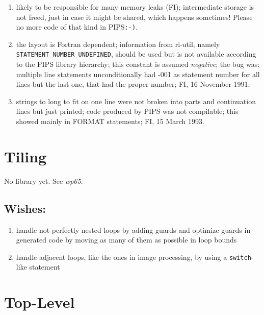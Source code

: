 \begin{enumerate}

  \item likely to be responsible for many memory leaks (FI); intermediate
	storage is not freed, just in case it might be shared, which happens
	sometimes! Please no more code of that kind in PIPS\verb+:-)+.

  \item the layout is Fortran dependent; information from ri-util,
	namely \verb+STATEMENT_NUMBER_UNDEFINED+, should be used but is
	not available according to the PIPS library hierarchy; this constant
	is assumed {\em negative}; the bug was: multiple line statements
	unconditionally had -001 as statement number for all lines but
	the last one, that had the proper number; FI, 16 November 1991;

  \item strings to long to fit on one line were not broken into parts
	and continuation lines but just printed; code produced by PIPS
	was not compilable; this showed mainly in FORMAT statements;
	FI, 15 March 1993.

\end{enumerate}

\section{Tiling}

No library yet. See {\em wp65}.

\subsection{Wishes:}

\begin{enumerate}

  \item handle not perfectly nested loops by adding guards and optimize
	guards in generated code by moving as many of them as possible
	in loop bounds

  \item handle adjacent loops, like the ones in image processing, by
	using a \verb+switch+-like statement

\end{enumerate}

\section{Top-Level}


